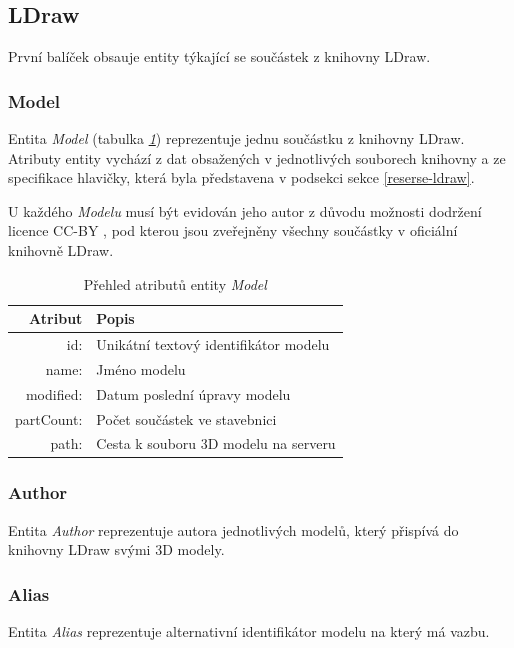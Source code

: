 \subsection{LDraw}
První balíček obsauje entity týkající se součástek z knihovny LDraw.

\subsubsection*{Model}
  Entita \textit{Model} (tabulka \emph{\ref{table:entity:model}}) reprezentuje jednu součástku z knihovny LDraw. Atributy entity vychází z dat obsažených v jednotlivých souborech knihovny a ze specifikace hlavičky, která byla představena v podsekci \emph{} sekce \ref{reserse-ldraw}.
    
  U každého \textit{Modelu} musí být evidován jeho autor z důvodu možnosti dodržení licence \gls{CC-BY} \cite{CC-BY}, pod kterou jsou zveřejněny všechny součástky v oficiální knihovně LDraw. 
  
  \begin{table}[th!]
  \centering
  \caption{Přehled atributů entity \textit{Model}}
  \label{table:entity:model}
  \begin{tabularx}{\textwidth}{@{}rX@{}}
  \toprule
  Atribut & Popis
  \\ 
  \midrule
  id: & Unikátní textový identifikátor modelu
  \\
  name: & Jméno modelu 
  \\
  modified: & Datum poslední úpravy modelu 
  \\
  partCount: & Počet součástek ve stavebnici
  \\
  path: & Cesta k souboru 3D modelu na serveru
  \\
  \bottomrule
  \end{tabularx}
  \end{table}

\subsubsection*{Author}
Entita \textit{Author} reprezentuje autora jednotlivých modelů, který přispívá do knihovny LDraw svými 3D modely. 
  
\subsubsection*{Alias}
Entita \textit{Alias} reprezentuje alternativní identifikátor modelu na který má vazbu. 

